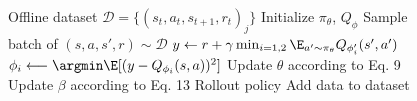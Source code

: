 \begin{wrapfigure}{R}{0.5\textwidth}
\begin{minipage}{0.99\textwidth}
    \begin{algorithm}[H]
       	\fcaption{\AWACMETHOD}
       	\label{alg:method}
       	\begin{algorithmic}[1]
       	\STATE Offline dataset $\mathcal{D} = \{(s_t, a_t, s_{t+1}, r_t)_j\}$
       	\STATE Initialize $\pi_\theta$, $Q_\phi$ 
       	    \STATE Sample batch of $(s, a, s', r) \sim \mathcal{D}$
            \STATE $y \gets r + \gamma \min_{i=1,2} \E_{a' \sim \pi_\theta} Q_{\phi'_i}(s', a')$
            \STATE $\phi_{i} \longleftarrow \argmin \E[(y - Q_{\phi_i}(s, a))^2]$
            \STATE Update $\theta$ according to Eq. 9
            \STATE Update $\beta$ according to Eq. 13
                \STATE Rollout policy
                \STATE Add data to dataset
            \ENDIF
       	\ENDFOR
       	\end{algorithmic}
    \end{algorithm}
\end{minipage}
\end{wrapfigure}